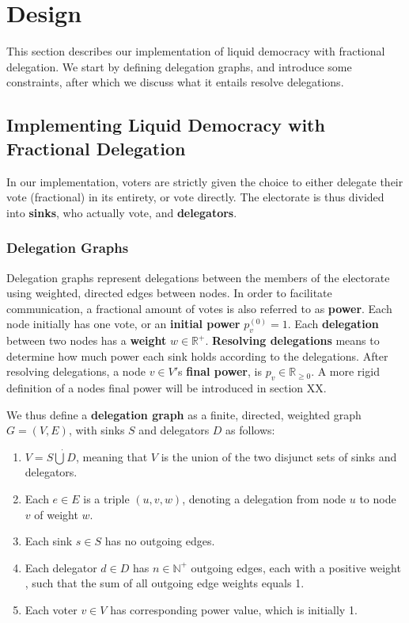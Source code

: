 \graphicspath{ {./figures/} }

\chapter{Design}
\label{sec:design}

This section describes our implementation of liquid democracy with fractional delegation. We start by defining delegation graphs, and introduce some constraints, after which we discuss what it entails resolve delegations.

\section{Implementing Liquid Democracy with Fractional Delegation}
\label{sec:ld_with_frac_del}

In our implementation, voters are strictly given the choice to either delegate their vote (fractional) in its entirety, or vote directly. The electorate is thus divided into \textbf{sinks}, who actually vote, and \textbf{delegators}. 

\subsection{Delegation Graphs}

Delegation graphs represent delegations between the members of the electorate using weighted, directed edges between nodes. In order to facilitate communication, a fractional amount of votes is also referred to as \textbf{power}. Each node initially has one vote, or an \textbf{initial power} $p^{(0)}_v = 1$. Each \textbf{delegation} between two nodes has a \textbf{weight} $w \in \mathbb{R}^+$. \textbf{Resolving delegations} means to determine how much power each sink holds according to the delegations. After resolving delegations, a node $v \in V'$s \textbf{final power}, is $p_v \in \mathbb{R}_{\ge0}$. A more rigid definition of a nodes final power will be introduced in section XX.

We thus define a \textbf{delegation graph} as a finite, directed, weighted graph $G = (V, E)$, with sinks $S$ and delegators $D$ as follows:

\begin{enumerate}
\item $V = S \dot\bigcup D$, meaning that $V$ is the union of the two disjunct sets of sinks and delegators.
\item Each $e \in E$ is a triple $(u, v, w)$, denoting a delegation from node $u$ to node $v$ of weight $w$.
\item Each sink $s \in S$ has no outgoing edges.
\item Each delegator $d \in D$ has $n \in \mathbb{N}^+$ outgoing edges, each with a positive weight \footnotemark, such that the sum of all outgoing edge weights equals 1.
\item Each voter $v \in V$ has corresponding power value, which is initially 1.
\end{enumerate}

